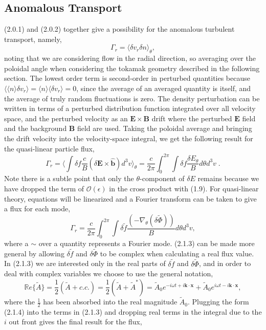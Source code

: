 \documentclass[12pt]{article}
\numberwithin{equation}{subsection}
\begin{document}
\subsection{Anomalous Transport}
   \quad (2.0.1) and (2.0.2) together give a possibility for the anomalous turbulent transport, namely,
   \begin{equation}
      \Gamma_r = \langle\delta v_r \delta n\rangle_\theta,
   \end{equation}
noting that we are considering flow in the radial direction, so averaging over the poloidal angle when considering the tokamak
geometry described in the following section. The lowest order term is second-order in perturbed quantities because
$\langle \langle n \rangle \delta v_r \rangle = \langle n \rangle \langle \delta v_r \rangle = 0$, since the average of an averaged
quantity is itself, and the average of truly random fluctuations is zero. The density perturbation can be written in terms of a
perturbed distribution function integrated over all velocity space, and the perturbed velocity as an $\bm{E}\times\bm{B}$ drift
where the perturbed $\bm{E}$ field and the background $\bm{B}$ field are used. Taking the poloidal average and bringing the drift
velocity into the velocity-space integral, we get the following result for the quasi-linear particle flux, 
   \begin{equation}
      \Gamma_r = \langle\int\delta f \frac{c}{B}(\delta\bm{E}\times\bm{\hat{b}}) d^{3}v\rangle_\theta
               = \frac{c}{2\pi}\int_{0}^{2\pi} \int\delta f \frac{\delta E_\theta}{B}d\theta d^{3}v \;.
   \end{equation}
Note there is a subtle point that only the $\theta$-component of $\delta E$ remains because we have dropped the term of
$\mathcal{O}(\epsilon)$ in the cross product with (1.9). For quasi-linear theory, equations will be linearized
and a Fourier transform can be taken to give a flux for each mode,
   \begin{equation}
      \Gamma_r = \frac{c}{2\pi}\int_{0}^{2\pi} \int\delta\widetilde{f}
                    \frac{(-\nabla_\theta(\delta\widetilde{\Phi}))}{B}d\theta d^{3}v,
   \end{equation}
where a $\sim$ over a quantity represents a Fourier mode. (2.1.3) can be made more general by allowing $\delta\widetilde{f}$ and $\delta\widetilde{\Phi}$
to be complex when calculating a real flux value. In (2.1.3) we are interested only in the real parts of $\delta\widetilde{f}$ and $\delta\widetilde{\Phi}$,
and in order to deal with complex variables we choose to use the general notation,
   \begin{equation}
      \mathbb{R}e\{\widetilde{A}\} = \frac{1}{2}(\widetilde{A} + c.c.) = \frac{1}{2}(\widetilde{A} + \widetilde{A}^*)
                                   = \widetilde{A}_0e^{-i\omega t + i\bm{k}\cdot\bm{x}} + \widetilde{A}_0e^{i\omega t -i\bm{k}\cdot\bm{x}},
   \end{equation}
where the $\frac{1}{2}$ has been absorbed into the real magnitude $\widetilde{A}_0$. Plugging the form (2.1.4) into
the terms in (2.1.3) and dropping real terms  in the integral due to the $i$ out front gives the final result for the flux,
\end{document}
